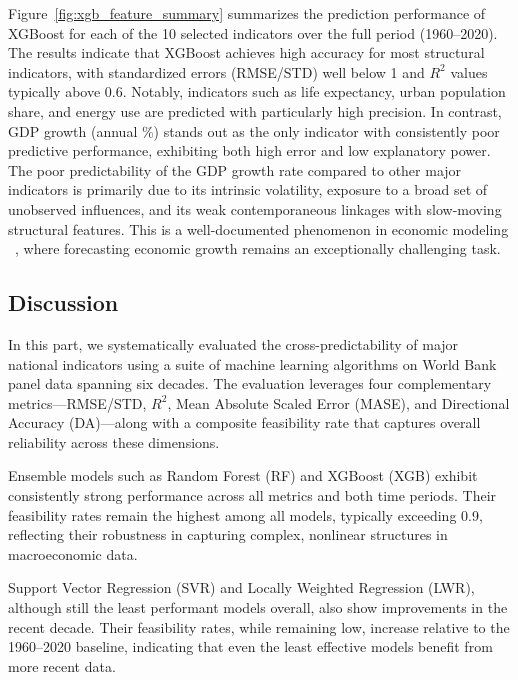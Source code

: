 \documentclass[12pt]{article}
\begin{document}
Figure~\ref{fig:xgb_feature_summary} summarizes the prediction performance of XGBoost for each of the 10 selected indicators over the full period (1960--2020). The results indicate that XGBoost achieves high accuracy for most structural indicators, with standardized errors (RMSE/STD) well below 1 and $R^2$ values typically above 0.6. Notably, indicators such as life expectancy, urban population share, and energy use are predicted with particularly high precision. In contrast, GDP growth (annual \%) stands out as the only indicator with consistently poor predictive performance, exhibiting both high error and low explanatory power. The poor predictability of the GDP growth rate compared to other major indicators is primarily due to its intrinsic volatility, exposure to a broad set of unobserved influences, and its weak contemporaneous linkages with slow-moving structural features. This is a well-documented phenomenon in economic modeling ~\cite{Loungani2001, ClementsHendry2002}, where forecasting economic growth remains an exceptionally challenging task.

\subsection{Discussion}

In this part, we systematically evaluated the cross-predictability of major national indicators using a suite of machine learning algorithms on World Bank panel data spanning six decades. The evaluation leverages four complementary metrics—RMSE/STD, $R^2$, Mean Absolute Scaled Error (MASE), and Directional Accuracy (DA)—along with a composite feasibility rate that captures overall reliability across these dimensions.

Ensemble models such as Random Forest (RF) and XGBoost (XGB) exhibit consistently strong performance across all metrics and both time periods. Their feasibility rates remain the highest among all models, typically exceeding 0.9, reflecting their robustness in capturing complex, nonlinear structures in macroeconomic data.

Support Vector Regression (SVR) and Locally Weighted Regression (LWR), although still the least performant models overall, also show improvements in the recent decade. Their feasibility rates, while remaining low, increase relative to the 1960–2020 baseline, indicating that even the least effective models benefit from more recent data.
\end{document}

